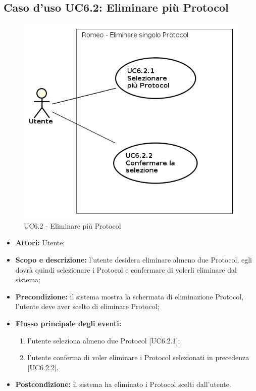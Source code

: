 \subsection{Caso d'uso UC6.2: Eliminare più Protocol}
\begin{figure}[!h]
\begin{center}
\includegraphics[scale=0.6]{./img/Use_Case/UC6_2}
\caption{UC6.2 - Eliminare più Protocol}
\end{center}
\end{figure}
\begin{itemize}
\item \textbf{Attori:} Utente;
\item \textbf{Scopo e descrizione:} l'utente desidera eliminare almeno due Protocol\glossario{}, egli dovrà quindi selezionare i Protocol\glossario{} {} e confermare di volerli eliminare dal sistema;
\item \textbf{Precondizione:} il sistema mostra la schermata di eliminazione Protocol\glossario{}, l'utente deve aver scelto di eliminare Protocol\glossario{};
\item \textbf{Flusso principale degli eventi: }
\begin{enumerate}
\item l'utente seleziona almeno due Protocol\glossario{} [UC6.2.1];
\item l'utente conferma di voler eliminare i Protocol\glossario{} selezionati in precedenza [UC6.2.2].
\end{enumerate}
\item \textbf{Postcondizione:} il sistema ha eliminato i Protocol\glossario{} scelti dall'utente.
\end{itemize}


